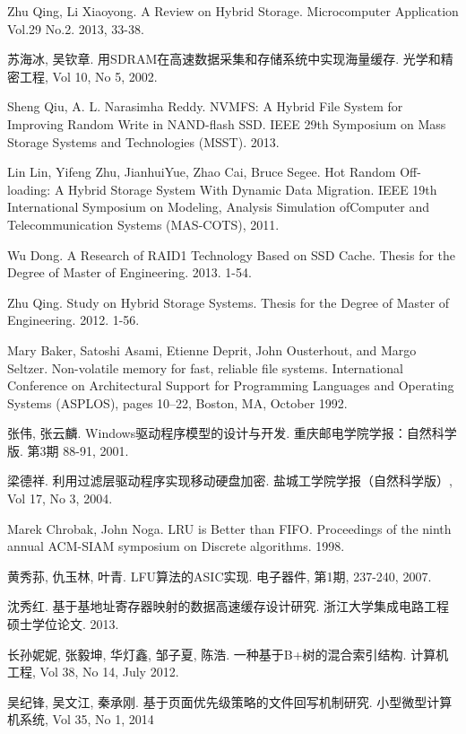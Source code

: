 \begin{thebibliography}
Zhu Qing, Li Xiaoyong. A Review on Hybrid Storage. Microcomputer Application Vol.29 No.2. 2013, 33-38.

苏海冰, 吴钦章. 用SDRAM在高速数据采集和存储系统中实现海量缓存. 光学和精密工程, Vol 10, No 5, 2002.

Sheng Qiu, A. L. Narasimha Reddy. NVMFS: A Hybrid File System for Improving Random Write in NAND-flash SSD. IEEE 29th Symposium on Mass Storage Systems and Technologies (MSST). 2013.

Lin Lin, Yifeng Zhu, JianhuiYue, Zhao Cai, Bruce Segee. Hot Random Off-loading: A Hybrid Storage System With Dynamic Data Migration. IEEE 19th International Symposium on Modeling, Analysis Simulation ofComputer and Telecommunication Systems (MAS-COTS), 2011.

Wu Dong. A Research of RAID1 Technology Based on SSD Cache. Thesis for the Degree of Master of Engineering. 2013. 1-54.

Zhu Qing. Study on Hybrid Storage Systems. Thesis for the Degree of Master of Engineering. 2012. 1-56.

Mary Baker, Satoshi Asami, Etienne Deprit, John Ousterhout, and Margo Seltzer. Non-volatile memory for fast, reliable file systems. International Conference on Architectural Support for Programming Languages and Operating Systems (ASPLOS), pages 10–22, Boston, MA, October 1992.

张伟, 张云麟. Windows驱动程序模型的设计与开发. 重庆邮电学院学报：自然科学版. 第3期 88-91, 2001.

梁德祥. 利用过滤层驱动程序实现移动硬盘加密. 盐城工学院学报（自然科学版）, Vol 17, No 3, 2004.

Marek Chrobak, John Noga. LRU is Better than FIFO. Proceedings of the ninth annual ACM-SIAM symposium on Discrete algorithms. 1998.

黄秀荪, 仇玉林, 叶青. LFU算法的ASIC实现. 电子器件, 第1期, 237-240, 2007.

沈秀红. 基于基地址寄存器映射的数据高速缓存设计研究. 浙江大学集成电路工程硕士学位论文. 2013.

长孙妮妮, 张毅坤, 华灯鑫, 邹子夏, 陈浩. 一种基于B+树的混合索引结构. 计算机工程, Vol 38, No 14, July 2012.

吴纪锋, 吴文江, 秦承刚. 基于页面优先级策略的文件回写机制研究. 小型微型计算机系统, Vol 35, No 1, 2014


\end{thebibliography}
